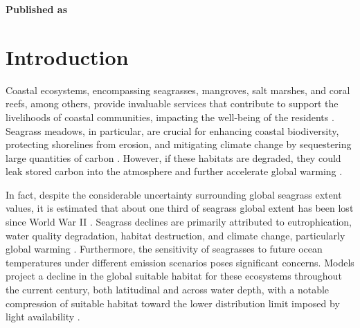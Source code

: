 \vspace{3cm}





\textbf{Published as}

\vspace{0.5cm}


\newpage
\section{Introduction}

Coastal ecosystems, encompassing seagrasses, mangroves, salt marshes, and coral
reefs, among others, provide invaluable services that contribute to support the
livelihoods of coastal communities, impacting the well-being of the residents
\cite{MEA2005,IUCN2008}. Seagrass meadows, in particular, are crucial for
enhancing coastal biodiversity, protecting shorelines from erosion, and
mitigating climate change by sequestering large quantities of carbon
\cite{DuarteNCC2013,Mcleod2011}. However, if these habitats are degraded, they
could leak stored carbon into the atmosphere and further accelerate global
warming \cite{DuarteNCC2013,Macreadie2014}.

In fact, despite the considerable uncertainty surrounding global seagrass
extent values, it is estimated that about one third of seagrass global extent
has been lost since World War II \cite{DuarteNCC2013}. Seagrass declines are
primarily attributed to eutrophication, water quality degradation, habitat
destruction, and climate change, particularly global warming
\cite{Waycott2009}. Furthermore, the
sensitivity of seagrasses to future ocean temperatures under different emission
scenarios poses significant concerns. Models project a decline in the global
suitable habitat for these ecosystems throughout the current century, both
latitudinal and across water depth, with a notable compression of suitable
habitat toward the lower distribution limit imposed by light availability
\cite{Jorda2020}.

